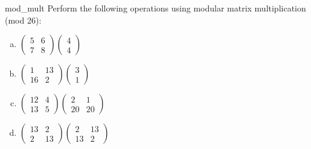 \begin{exercise}{mod_mult}
Perform the following operations using modular matrix multiplication (mod 26):
\begin{multicols}{2}
\begin{enumerate}[(a)]
\item
$\left(
\begin{array}{cc}
5 & 6 \\
7 & 8
\end{array}
\right)
\left(
\begin{array}{c}
4 \\
4
\end{array}
\right)$
\item
$\left(
\begin{array}{cc}
1 & 13 \\
16 & 2
\end{array}
\right)
\left(
\begin{array}{c}
3 \\
1
\end{array}
\right)$
\item
$\left(
\begin{array}{cc}
12 & 4 \\
13 & 5
\end{array}
\right)
\left(
\begin{array}{cc}
2 &1 \\
20 & 20 
\end{array}
\right)$
\item
$\left(
\begin{array}{cc}
13 & 2 \\
2 & 13
\end{array}
\right)
\left(
\begin{array}{cc}
2 &13 \\
13 & 2 
\end{array}
\right)$
\end{enumerate}
\end{multicols}
\end{exercise} 
 
